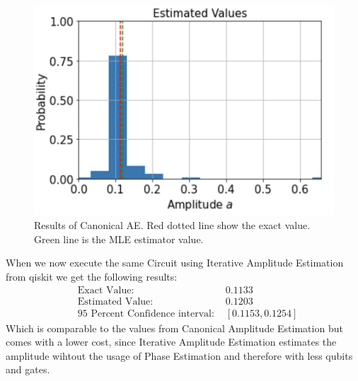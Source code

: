 \documentclass[../main.tex]{subfiles}
\begin{document}
 \begin{figure}[H]
  \begin{center}
    \includegraphics[width=\linewidth]{../../images/resultAE.png}
  \end{center}
  \caption{Results of Canonical AE. Red dotted line show the exact value. Green line is the MLE estimator value. }
  \label{fig:resultAE}
\end{figure}
When we now execute the same Circuit using Iterative Amplitude Estimation \cite{Grinko_2021} from qiskit we get the following results:
\begin{align}
    &\text{Exact Value: } &0.1133\\
    &\text{Estimated Value: } &0.1203\\
    &\text{95 Percent Confidence interval:	} &[0.1153, 0.1254]
\end{align}
Which is comparable to the values from Canonical Amplitude Estimation but comes with a lower cost, since Iterative Amplitude Estimation estimates the amplitude wihtout the usage of Phase Estimation and therefore with less qubits and gates.
\biblio
\end{document}
